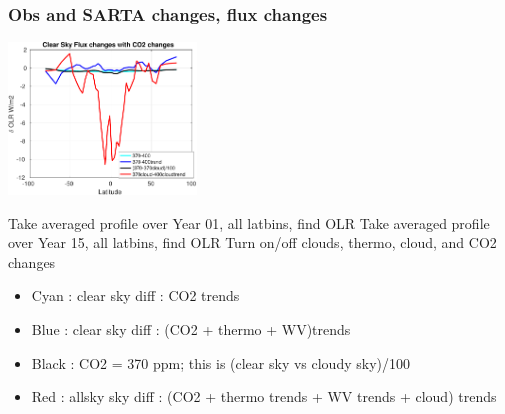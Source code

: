 \documentclass[10pt,t]{beamer}
\begin{document}
\begin{frame}
  \frametitle{Obs and SARTA changes, flux changes}

  \begin{center}
    \noindent\includegraphics[width=0.375\textwidth]{Figs/deltaolr_vs_lat.pdf}
  \end{center}

  Take averaged profile over Year 01, all latbins, find OLR \newline
  Take averaged profile over Year 15, all latbins, find OLR \newline
  Turn on/off clouds, thermo, cloud, and CO2 changes
  \begin{itemize}
  \item Cyan : clear sky diff : CO2 trends
  \item Blue : clear sky diff : (CO2 + thermo + WV)trends
  \item Black : CO2 = 370 ppm; this is (clear sky vs cloudy sky)/100
  \item Red : allsky sky diff : (CO2 + thermo trends + WV trends + cloud) trends
  \end{itemize}
\end{frame}
\end{document}

